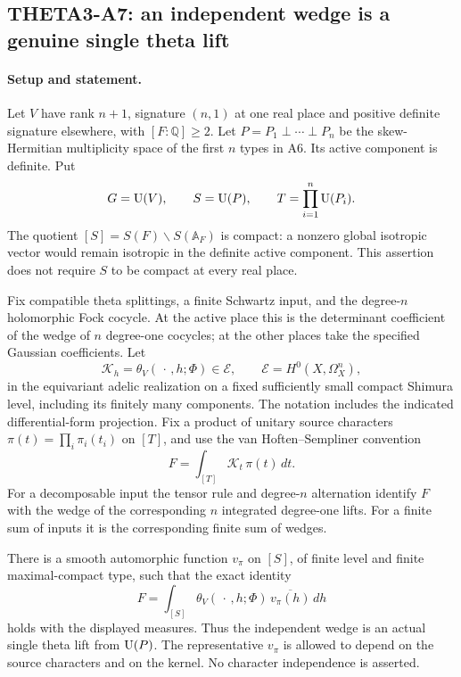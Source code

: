 \documentclass[11pt]{article}
\newcommand{\Q}{\mathbb Q}\newcommand{\C}{\mathbb C}\newcommand{\Z}{\mathbb Z}\newcommand{\R}{\mathbb R}\newcommand{\A}{\mathbb A}\newcommand{\OO}{\mathcal O}
\theoremstyle{definition}\newtheorem{definition}[theorem]{Definition}\newtheorem{remark}[theorem]{Remark}
\begin{document}

\subsection{THETA3-A7: an independent wedge is a genuine single theta lift}\label{A7}

\paragraph{Setup and statement.}
Let $V$ have rank $n+1$, signature $(n,1)$ at one real place and
positive definite signature elsewhere, with $[F:\Q]\geq2$.
Let $P=P_1\perp\cdots\perp P_n$ be the skew-Hermitian multiplicity
space of the first $n$ types in A6. Its active component is definite.
Put
\[
 G=\operatorname{U}(V),\qquad S=\operatorname{U}(P),\qquad T=\prod_{i=1}^n\operatorname{U}(P_i).
\]
The quotient $[S]=S(F)\backslash S(\A_F)$ is compact: a nonzero
global isotropic vector would remain isotropic in the definite
active component. This assertion does not require $S$ to be compact
at every real place.

Fix compatible theta splittings, a finite Schwartz input, and the
degree-$n$ holomorphic Fock cocycle. At the active place this is
the determinant coefficient of the wedge of $n$ degree-one
cocycles; at the other places take the specified Gaussian
coefficients. Let
\[
 \mathcal K_h=\theta_V(\,\cdot\,,h;\Phi)\in\mathcal E,\qquad
 \mathcal E=H^0(X,\Omega_X^n),
\]
in the equivariant adelic realization on a fixed sufficiently small
compact Shimura level, including its finitely many components.
The notation includes the indicated differential-form projection.
Fix a product of unitary source characters
$\pi(t)=\prod_i\pi_i(t_i)$ on $[T]$, and use the
van Hoften--Sempliner convention
\[
 F=\int_{[T]}\mathcal K_t\,\pi(t)\,dt.
\]
For a decomposable input the tensor rule and degree-$n$ alternation
identify $F$ with the wedge of the corresponding $n$ integrated
degree-one lifts. For a finite sum of inputs it is the corresponding
finite sum of wedges.

There is a smooth automorphic function $v_\pi$ on $[S]$, of finite
level and finite maximal-compact type, such that the exact identity
\begin{equation}\label{A7-lift}
 F=\int_{[S]}\theta_V(\,\cdot\,,h;\Phi)\,
                                  \overline{v_\pi(h)}\,dh
\end{equation}
holds with the displayed measures. Thus the independent wedge is
an actual single theta lift from $\operatorname{U}(P)$. The representative
$v_\pi$ is allowed to depend on the source characters and on the
kernel. No character independence is asserted.
\end{document}
